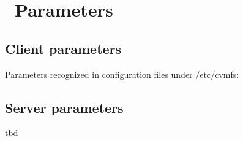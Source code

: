 \chapter{\cvmfs\ Parameters}
\label{apx:parameters}

\section{Client parameters}
Parameters recognized in configuration files under /etc/cvmfs:


\section{Server parameters}
{\huge tbd}
